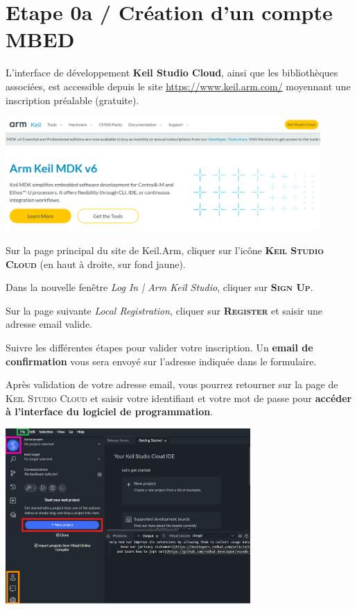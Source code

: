 \documentclass[a4paper,11pt,titlepage]{article} %
\begin{document}
\section{Etape 0a / Création d'un compte MBED}

L'interface de développement \textbf{Keil Studio Cloud}, ainsi que les bibliothèques associées, est accessible depuis le site \href{https://www.keil.arm.com/}{https://www.keil.arm.com/} moyennant une inscription préalable (gratuite).

\begin{center}
	\includegraphics[width=0.9\textwidth]{images/keil_arm_com.png}
\end{center}

Sur la page principal du site de Keil.Arm, cliquer sur l'icône \textsc{\textbf{Keil Studio Cloud}} (en haut à droite, sur fond jaune).

Dans la nouvelle fenêtre \textsl{Log In | Arm Keil Studio}, cliquer sur \textsc{\textbf{Sign Up}}.

Sur la page suivante \textsl{Local Registration}, cliquer sur \textsc{\textbf{Register}} et saisir une adresse email valide.

Suivre les différentes étapes pour valider votre inscription. Un \textbf{email de confirmation} vous sera envoyé sur l'adresse indiquée dans le formulaire.

Après validation de votre adresse email, vous pourrez retourner sur la page de \textsc{Keil Studio Cloud} et saisir votre identifiant et votre mot de passe pour \textbf{accéder à l'interface du logiciel de programmation}.


\begin{center}
	\includegraphics[width=0.7\textwidth]{images/keil_cloud_plus.png}
\end{center}
\end{document}
